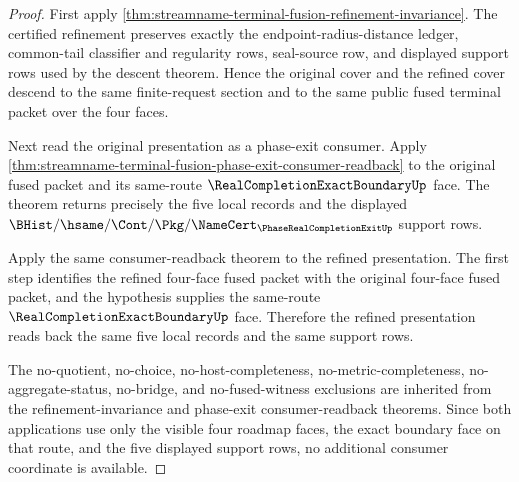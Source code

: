 \begin{proof}
First apply
\autoref{thm:streamname-terminal-fusion-refinement-invariance}. The certified
refinement preserves exactly the endpoint-radius-distance ledger, common-tail
classifier and regularity rows, seal-source row, and displayed support rows
used by the descent theorem. Hence the original cover and the refined cover
descend to the same finite-request section and to the same public fused
terminal packet over the four faces.

Next read the original presentation as a phase-exit consumer. Apply
\autoref{thm:streamname-terminal-fusion-phase-exit-consumer-readback} to the
original fused packet and its same-route $\RealCompletionExactBoundaryUp$
face. The theorem returns precisely the five local records and the displayed
$\BHist/\hsame/\Cont/\Pkg/\NameCert_{\PhaseRealCompletionExitUp}$ support
rows.

Apply the same consumer-readback theorem to the refined presentation. The
first step identifies the refined four-face fused packet with the original
four-face fused packet, and the hypothesis supplies the same-route
$\RealCompletionExactBoundaryUp$ face. Therefore the refined presentation
reads back the same five local records and the same support rows.

The no-quotient, no-choice, no-host-completeness, no-metric-completeness,
no-aggregate-status, no-bridge, and no-fused-witness exclusions are inherited
from the refinement-invariance and phase-exit consumer-readback theorems.
Since both applications use only the visible four roadmap faces, the exact
boundary face on that route, and the five displayed support rows, no additional
consumer coordinate is available.
\end{proof}

